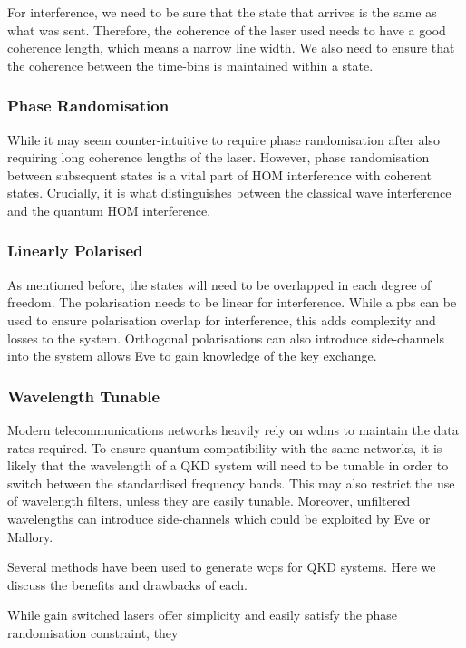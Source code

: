 For interference, we need to be sure that the state that arrives is the same as what was sent. Therefore, the coherence of the laser used needs to have a good coherence length, which means a narrow line width. We also need to ensure that the coherence between the time-bins is maintained within a state.

\subsubsection*{Phase Randomisation}

While it may seem counter-intuitive to require phase randomisation after also requiring long coherence lengths of the laser. However, phase randomisation between subsequent states is a vital part of \ac{HOM} interference with coherent states. Crucially, it is what distinguishes between the classical wave interference and the quantum \ac{HOM} interference.

\subsubsection*{Linearly Polarised}

As mentioned before, the states will need to be overlapped in each degree of freedom. The polarisation needs to be linear for interference. While a \ac{pbs} can be used to ensure polarisation overlap for interference, this adds complexity and losses to the system. Orthogonal polarisations can also introduce side-channels into the system allows Eve to gain knowledge of the key exchange.

\subsubsection*{Wavelength Tunable}

Modern telecommunications networks heavily rely on \acp{wdm} to maintain the data rates required. To ensure quantum compatibility with the same networks, it is likely that the wavelength of a \ac{QKD} system will need to be tunable in order to switch between the standardised frequency bands. This may also restrict the use of wavelength filters, unless they are easily tunable. Moreover, unfiltered wavelengths can introduce side-channels which could be exploited by Eve or Mallory.

Several methods have been used to generate \acp{wcp} for \ac{QKD} systems. Here we discuss the benefits and drawbacks of each.

While gain switched lasers offer simplicity and easily satisfy the phase randomisation constraint, they  

